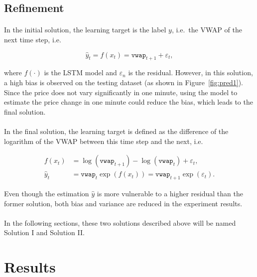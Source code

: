 \documentclass[12pt, letterpaper]{article}
\begin{document}
\subsection{Refinement}\label{sec:refinement}

\paragraph{}
In the initial solution, the learning target is the label \(y\), i.e.\ the VWAP of the next time step, i.e.

\begin{equation*}
    \hat y_t=f(x_t)=\mathtt{vwap}_{t+1}+\varepsilon_t,
\end{equation*}

where \(f(\cdot)\) is the LSTM model and \(\varepsilon_n\) is the residual. However, in this solution, a high bias is observed on the testing dataset (as shown in Figure~\ref{fig:pred1}). Since the price does not vary significantly in one minute, using the model to estimate the price change in one minute could reduce the bias, which leads to the final solution.

\paragraph{}
In the final solution, the learning target is defined as the difference of the logarithm of the VWAP between this time step and the next, i.e.

\begin{align*}
    f(x_t)&=\log(\mathtt{vwap}_{t+1})-\log(\mathtt{vwap}_t)+\varepsilon_t, \\
    \hat y_t&=\mathtt{vwap}_t\exp(f(x_t))=\mathtt{vwap}_{t+1}\exp(\varepsilon_t).
\end{align*}

Even though the estimation \(\hat y\) is more vulnerable to a higher residual than the former solution, both bias and variance are reduced in the experiment results.

\paragraph{}
In the following sections, these two solutions described above will be named Solution I and Solution II\@.

\section{Results} %
\end{document}
